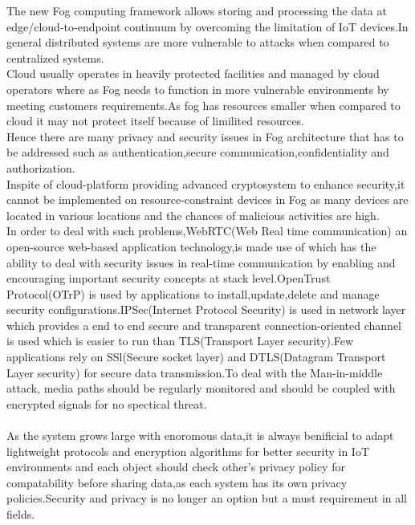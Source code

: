 The new Fog computing framework allows storing and processing the data at edge/cloud-to-endpoint continuum by overcoming the limitation of IoT devices.In general distributed systems are more vulnerable to attacks when compared to centralized systems.\\
Cloud usually operates in heavily protected facilities and managed by cloud operators where as Fog needs to function in more vulnerable environments by meeting customers requirements.As fog has resources smaller when compared to cloud it may not protect itself because of limilited resources.\\
Hence there are many privacy and security issues in Fog architecture that has to be addressed such as authentication,secure communication,confidentiality and authorization.\\
Inspite of cloud-platform providing advanced cryptosystem to enhance security,it cannot be implemented on resource-constraint devices in Fog as many devices are located in various locations and the chances of malicious activities are high\cite{9}.\\
In order to deal with such problems,WebRTC(Web Real time communication) an open-source web-based application technology,is made use of which has the ability to deal with security issues in real-time communication by enabling and encouraging important security concepts at stack level.OpenTrust Protocol(OTrP) is used by applications to install,update,delete and manage security configurations.IPSec(Internet Protocol Security) is used in network layer which provides a end to end secure and transparent connection-oriented channel is used which is easier to run than TLS(Transport Layer security).Few applications rely on SSl(Secure socket layer) and DTLS(Datagram Transport Layer security) for secure data transmission.To deal with the Man-in-middle attack, media paths should be regularly monitored and should be coupled with encrypted signals for no spectical threat\cite{sec}.\\ \\
As the system grows large with enoromous data,it is always benificial to adapt lightweight protocols and encryption algorithms for better security in IoT environments and each object should check other's privacy policy for compatability before sharing data,as each system has its own privacy policies.Security and privacy is no longer an option but a must requirement in all fields.
